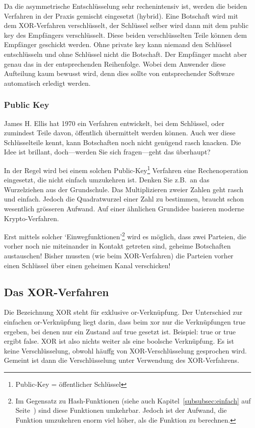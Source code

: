 Da die asymmetrische Entschlüsselung sehr rechenintensiv ist, werden die
beiden Verfahren in der Praxis gemischt eingesetzt (hybrid). Eine Botschaft
wird mit dem XOR-Verfahren verschlüsselt, der Schlüssel selber wird dann
mit dem public key des Empfängers verschlüsselt. Diese beiden verschlüsselten
Teile können dem Empfänger geschickt werden. Ohne private key kann niemand
den Schlüssel entschlüsseln und ohne Schlüssel nicht die Botschaft. Der
Empfänger macht aber genau das in der entsprechenden Reihenfolge.
Wobei dem Anwender diese Aufteilung kaum bewusst wird, denn dies
sollte von entsprechender Software automatisch erledigt werden.

\subsubsection*{Public Key}

James H. Ellis hat 1970 ein Verfahren entwickelt, bei dem Schlüssel, oder
zumindest Teile davon, öffentlich übermittelt werden können. Auch wer
diese Schlüsselteile kennt, kann Botschaften noch nicht genügend rasch
knacken. Die Idee ist brillant, doch---werden Sie sich fragen---geht
das überhaupt?

In der Regel wird bei einem solchen Public-Key\footnote{Public-Key = öffentlicher Schlüssel}
Verfahren eine Rechenoperation eingesetzt, die nicht einfach umzukehren ist.
Denken Sie z.B.~an das Wurzelziehen aus der Grundschule. Das Multiplizieren
zweier Zahlen geht rasch und einfach. Jedoch die Quadratwurzel einer Zahl
zu bestimmen, braucht schon wesentlich grösseren Aufwand. Auf einer
ähnlichen Grundidee basieren moderne Krypto-Verfahren.

Erst mittels solcher `Einwegfunktionen'\footnote{Im Gegensatz zu
Hash-Funktionen (siehe auch Kapitel~\ref{subsubsec:einfach} auf
Seite~\pageref{subsubsec:einfach}) sind diese Funktionen umkehrbar.
Jedoch ist der Aufwand, die Funktion umzukehren enorm viel höher,
als die Funktion zu berechnen.} wird es möglich, dass zwei Parteien,
die vorher noch nie miteinander in Kontakt getreten sind, geheime
Botschaften austauschen! Bisher mussten (wie beim XOR-Verfahren)
die Parteien vorher einen Schlüssel über einen geheimen Kanal verschicken!

\subsection{Das XOR-Verfahren}
\label{subsec:xor}

Die Bezeichnung XOR steht für exklusive or-Verknüpfung. Der Unterschied
zur einfachen or-Verknüpfung liegt darin, dass beim xor nur die
Verknüpfungen true ergeben, bei denen nur ein Zustand auf true
gesetzt ist. Beispiel: true or true ergibt false. XOR ist also
nichts weiter als eine boolsche Verknüpfung. Es ist keine
Verschlüsselung, obwohl häuffg von XOR-Verschlüsselung gesprochen
wird. Gemeint ist dann die Verschlüsselung unter Verwendung des
XOR-Verfahrens.

